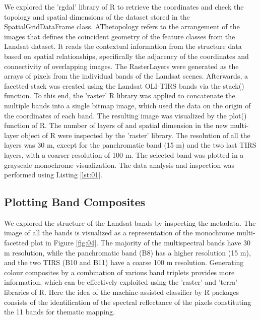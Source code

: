 \documentclass[applsci,article,accept,pdftex,moreauthors]{Definitions/mdpi}
\begin{document}
\vspace{6pt}
We explored the 'rgdal' library of R to retrieve the coordinates and check the topology and spatial dimensions of the dataset stored in the SpatialGridDataFrame class. AThetopology refers to the arrangement of the images that defines the coincident geometry of the feature classes from the Landsat dataset. It reads the contextual information from the structure data based on spatial relationships, specifically the adjacency of the coordinates and connectivity of overlapping images. The RasterLayers were generated as the arrays of pixels from the individual bands of the Landsat scenes. Afterwards, a facetted stack was created using the Landsat OLI-TIRS bands via the stack() function. To this end, the 'raster' R library was applied to concatenate the multiple bands into a single bitmap image, which used the data on the origin of the coordinates of each band. The resulting image was visualized by the plot() function of R. The number of layers of and spatial dimension in the new multi-layer object of R were inspected by the 'raster' library. The resolution of all the layers was 30 m, except for the panchromatic band (15 m) and the two last TIRS layers, with a coarser resolution of 100 m. The selected band was plotted in a grayscale monochrome visualization. The data analysis and inspection was performed using Listing \ref{lst:01}.

\subsection{Plotting Band Composites}

We explored the structure of the Landsat bands by inspecting the metadata. The image of all the bands is visualized as a representation of the monochrome multi-facetted plot in Figure \ref{fig:04}. The majority of the multispectral bands have 30 m resolution, while the panchromatic band (B8) has a higher resolution (15 m), and the two TIRS (B10 and B11) have a coarse 100 m resolution. Generating colour composites by a combination of various band triplets provides more information, which can be effectively exploited using the 'raster' and 'terra' libraries of R. Here the idea of the machine-assisted classifier by R packages consists of the identification of the spectral reflectance of the pixels constituting the 11 bands for thematic mapping. 
\end{document}
